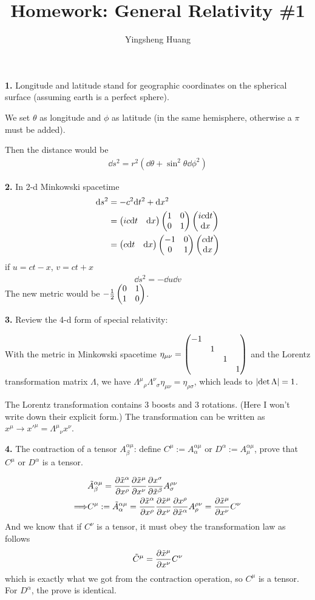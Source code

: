 \documentclass{article}
\title{Homework: General Relativity \#1}
\author{Yingsheng Huang}
\begin{document}
\maketitle
{\bf1.}\quad
Longitude and latitude stand for geographic coordinates on the spherical surface (assuming earth is a perfect sphere).

We set $\theta$ as longitude and $\phi$ as latitude (in the same hemisphere, otherwise a $\pi$ must be added).

Then the distance would be
\begin{align*}
  \dd s^2=r^2(\dd\theta+\sin^2\theta\dd\phi^2)
\end{align*}

{\bf2.}\quad
In 2-d Minkowski spacetime
\begin{align*}
  \dd s^2&=-c^2\dd t^2+\dd x^2\\
  &=\pmqty{ic\dd t&\dd x}\pmqty{1&0\\0&1}\pmqty{ic\dd t\\\dd x}\\
  &=\pmqty{c\dd t&\dd x}\pmqty{-1&0\\0&1}\pmqty{c\dd t\\\dd x}
\end{align*}
if $u=ct-x$, $v=ct+x$
\begin{align*}
  \dd s^2=-\dd u\dd v
\end{align*}
The new metric would be $-\frac{1}{2}\pmqty{0&1\\1&0}$.

{\bf3.}\quad
Review the 4-d form of special relativity:

With the metric in Minkowski spacetime $\eta_{\mu\nu}=\pmqty{-1\\&1\\&&1\\&&&1}$ and the Lorentz transformation matrix $\Lambda$, we have $\Lambda^{\mu}{}_{\rho}\Lambda^{\nu}{}_{\sigma}\eta_{\mu\nu}=\eta_{\rho\sigma}$, which leads to $\abs{\det\Lambda}=1$.

The Lorentz transformation contains 3 boosts and 3 rotations. (Here I won't write down their explicit form.) The transformation can be written as $x^{\mu}\rightarrow x'^{\mu}=\Lambda^{\mu}{}_{\nu}x^{\nu}$.

{\bf4.}\quad
The contraction of a tensor $A^{\alpha\mu}_{\beta}$: define $C^{\mu}:=A^{\alpha\mu}_{\alpha}$ or $D^{\alpha}:=A^{\alpha\mu}_{\mu}$, prove that $C^{\mu}$ or $D^{\alpha}$ is a tensor.

\begin{align*}
  &\tilde A^{\alpha\mu}_{\beta}=\pdv{\tilde x^{\alpha}}{x^{\rho}}\pdv{\tilde x^{\mu}}{x^{\nu}}\pdv{x^{\sigma}}{\tilde x^{\beta}}A^{\rho\nu}_{\sigma}\\\Longrightarrow&C^{\mu}:=\tilde A^{\alpha\mu}_{\alpha}=\pdv{\tilde x^{\alpha}}{x^{\rho}}\pdv{\tilde x^{\mu}}{x^{\nu}}\pdv{x^{\rho}}{\tilde x^{\alpha}}A^{\rho\nu}_{\rho}=\pdv{\tilde x^{\mu}}{x^{\nu}}C^{\nu}
\end{align*}
And we know that if $C^{\nu}$ is a tensor, it must obey the transformation law as follows
$$\tilde C^{\mu}=\pdv{\tilde x ^{\mu}}{x^{\nu}}C^{\nu}$$
which is exactly what we got from the contraction operation, so $C^{\mu}$ is a tensor. For $D^{\alpha}$, the prove is identical.
\end{document}
